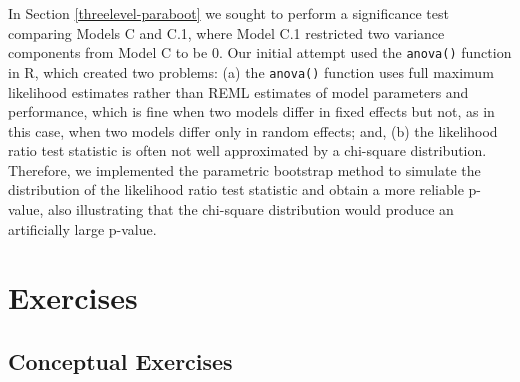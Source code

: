 \documentclass[
]{krantz}
\begin{document}
In Section \ref{threelevel-paraboot} we sought to perform a significance test comparing Models C and C.1, where Model C.1 restricted two variance components from Model C to be 0. Our initial attempt used the \texttt{anova()} function in R, which created two problems: (a) the \texttt{anova()} function uses full maximum likelihood estimates rather than REML estimates of model parameters and performance, which is fine when two models differ in fixed effects but not, as in this case, when two models differ only in random effects; and, (b) the likelihood ratio test statistic is often not well approximated by a chi-square distribution. Therefore, we implemented the parametric bootstrap method to simulate the distribution of the likelihood ratio test statistic and obtain a more reliable p-value, also illustrating that the chi-square distribution would produce an artificially large p-value.

\section{Exercises}\label{exercises-9}

\subsection{Conceptual Exercises}\label{conceptual-exercises-7}
\end{document}
